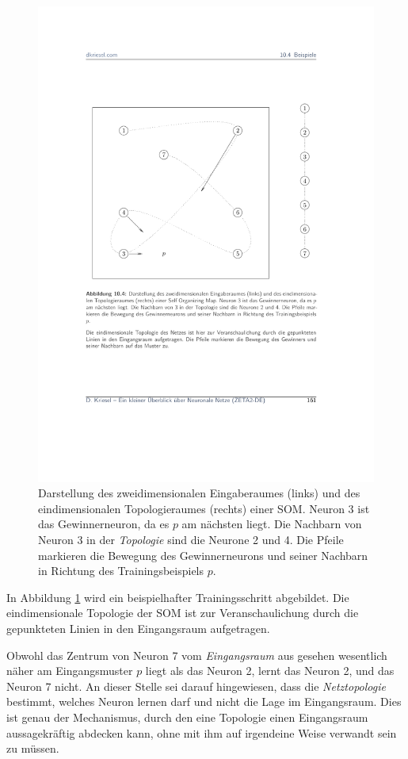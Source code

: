 \begin{figure}[ht!] \centering 
	\includegraphics[width=\linewidth]{figures/ch08_som-training.pdf}
	\caption{Darstellung des zweidimensionalen Eingaberaumes (links) und des eindimensionalen Topologieraumes (rechts) einer SOM. Neuron 3 ist das Gewinnerneuron, da es $p$ am nächsten liegt. Die Nachbarn von Neuron 3 in der \emph{Topologie} sind die Neurone 2 und 4. Die Pfeile markieren die Bewegung des Gewinnerneurons und seiner Nachbarn in Richtung des Trainingsbeispiels $p$.}
	\label{fig:ch08_som-training}
\end{figure}

In Abbildung \ref{fig:ch08_som-training} wird ein beispielhafter Trainingsschritt abgebildet. Die eindimensionale Topologie der SOM ist zur Veranschaulichung durch die gepunkteten Linien in den Eingangsraum aufgetragen.

Obwohl das Zentrum von Neuron 7 vom \emph{Eingangsraum} aus gesehen wesentlich näher am Eingangsmuster $p$ liegt als das Neuron 2, lernt das Neuron 2, und das Neuron 7 nicht.
An dieser Stelle sei darauf hingewiesen, dass die \emph{Netztopologie} bestimmt, welches Neuron lernen darf und nicht die Lage im Eingangsraum.
Dies ist genau der Mechanismus, durch den eine Topologie einen Eingangsraum aussagekräftig abdecken kann, ohne mit ihm auf irgendeine Weise verwandt sein zu müssen.


